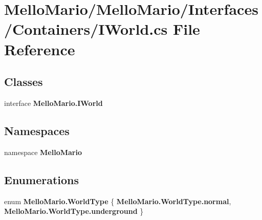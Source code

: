 \section{Mello\+Mario/\+Mello\+Mario/\+Interfaces/\+Containers/\+I\+World.cs File Reference}
\label{IWorld_8cs}
\subsection*{Classes}
\begin{DoxyCompactItemize}
\item 
interface \textbf{ Mello\+Mario.\+I\+World}
\end{DoxyCompactItemize}
\subsection*{Namespaces}
\begin{DoxyCompactItemize}
\item 
namespace \textbf{ Mello\+Mario}
\end{DoxyCompactItemize}
\subsection*{Enumerations}
\begin{DoxyCompactItemize}
\item 
enum \textbf{ Mello\+Mario.\+World\+Type} \{ \textbf{ Mello\+Mario.\+World\+Type.\+normal}, 
\textbf{ Mello\+Mario.\+World\+Type.\+underground}
 \}
\end{DoxyCompactItemize}
